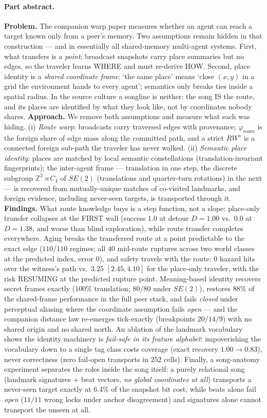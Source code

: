 \documentclass{article}
\newcommand{\rwstar}{RW^{\star}}
\newcommand{\phiroute}{\varphi_{\mathrm{route}}}
\begin{document}
\paragraph{Part abstract.} \textbf{Problem.} The companion warp paper measures whether an agent can reach a target known only from a peer's memory. Two assumptions remain hidden in that construction --- and in essentially all shared-memory multi-agent systems. First, what transfers is a \emph{point}: broadcast snapshots carry place summaries but no edges, so the traveler learns WHERE and must re-derive HOW. Second, place identity is a \emph{shared coordinate frame}: `the same place' means `close $(x,y)$ in a grid the environment hands to every agent'; semantics only breaks ties inside a spatial radius. In the source culture a songline is neither: the song IS the route, and its places are identified by what they look like, not by coordinates nobody shares.
\textbf{Approach.} We remove both assumptions and measure what each was hiding. (i) \emph{Route warp}: broadcasts carry traversed edges with provenance; $\phiroute$ is the foreign share of edge mass along the committed path, and a strict $\rwstar$ is a connected foreign sub-path the traveler has never walked. (ii) \emph{Semantic place identity}: places are matched by local semantic constellations (translation-invariant fingerprints); the inter-agent frame --- translation in one step, the discrete subgroup $\mathbb{Z}^2\rtimes C_4$ of $SE(2)$ (translations and quarter-turn rotations) in the next --- is recovered from mutually-unique matches of co-visited landmarks, and foreign evidence, including never-seen targets, is transported through it.
\textbf{Findings.} What route knowledge buys is a step function, not a slope: place-only transfer collapses at the FIRST wall (success $1.0$ at detour $D{=}1.00$ vs.\ $0.0$ at $D{=}1.38$, and worse than blind exploration), while route transfer completes everywhere. Aging breaks the transferred route at a point predictable to the exact edge ($110/110$ regimes; all $40$ mid-route ruptures across two world classes at the predicted index, error $0$), and safety travels with the route: $0$ hazard hits over the witness's path vs.\ $3.25$ $[2.45,4.10]$ for the place-only traveler, with the risk RESUMING at the predicted rupture point. Meaning-based identity recovers secret frames exactly ($100\%$ translation; $80/80$ under $SE(2)$), restores $88\%$ of the shared-frame performance in the full peer stack, and fails \emph{closed} under perceptual aliasing where the coordinate assumption fails \emph{open} --- and the companion distance law re-emerges tick-exactly (breakpoints $20/14/9$) with no shared origin and no shared north. An ablation of the landmark vocabulary shows the identity machinery is \emph{fail-safe in its feature alphabet}: impoverishing the vocabulary down to a single tag class costs coverage (exact recovery $1.00 \to 0.83$), never correctness (zero fail-open transports in $252$ cells). Finally, a song-anatomy experiment separates the roles inside the song itself: a purely relational song (landmark signatures $+$ beat vectors, \emph{no global coordinates at all}) transports a never-seen target exactly at $6.4\%$ of the snapshot bit cost, while beats alone fail \emph{open} ($11/11$ wrong locks under anchor disagreement) and signatures alone cannot transport the unseen at all.
\end{document}
